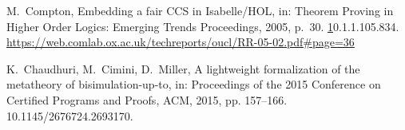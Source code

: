 \documentclass[GCNS]{yincog}
\theoremstyle{remark}
\theoremstyle{theorem}
\theoremstyle{remark}
\begin{document}
\begin{backmatter}
\begin{thebibliography}{}
\begin{bsubitem}
\begin{bcontribution}%
\end{bcontribution}
\begin{bhost}
\begin{beditedbook}
\end{beditedbook}
\end{bhost}
\begin{bhost}
\begin{behost}
\end{behost}
\end{bhost}
\end{bsubitem}
%
\OrigBibText
M.~Compton,
{{Embedding
a fair CCS in Isabelle/HOL}}, in: Theorem Proving in Higher Order Logics:
Emerging Trends Proceedings, 2005, p.~30. \href {https://doi.org/10.1.1.105.834} 10.1.1.105.834.
\url{https://web.comlab.ox.ac.uk/techreports/oucl/RR-05-02.pdf\#page=36}
\endOrigBibText
{}%
\endbibitem

\begin{bsubitem}
\begin{bcontribution}%
\end{bcontribution}
\begin{bhost}
\begin{beditedbook}
\end{beditedbook}
\end{bhost}
\end{bsubitem}
%
\OrigBibText
K.~Chaudhuri, M.~Cimini, D.~Miller, A lightweight formalization of the
metatheory of bisimulation-up-to, in: Proceedings of the 2015 Conference
on Certified Programs and Proofs, ACM, 2015, pp. 157--166. 10.1145/2676724.2693170.
\endOrigBibText
{}%
\endbibitem


\end{thebibliography}
\end{backmatter}
\end{document}
